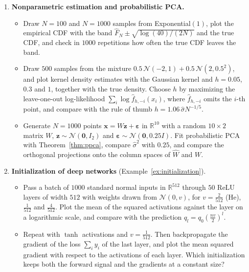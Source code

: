 \documentclass[11pt]{article}
\theoremstyle{definition}
\theoremstyle{plain}
\theoremstyle{remark}
\begin{document}
\begin{enumerate}[label=\textbf{P\arabic*.}, leftmargin=*]
    \item \textbf{Nonparametric estimation and probabilistic PCA.}
    \begin{itemize}
        \item Draw $N = 100$ and $N = 1000$ samples from Exponential$(1)$, plot the empirical CDF with the band $\hat F_N \pm \sqrt{\log(40)/(2N)}$ and the true CDF, and check in $1000$ repetitions how often the true CDF leaves the band.
        \item Draw $500$ samples from the mixture $0.5\,\mathcal{N}(-2, 1) + 0.5\,\mathcal{N}(2, 0.5^2)$, and plot kernel density estimates with the Gaussian kernel and $h = 0.05$, $0.3$ and $1$, together with the true density. Choose $h$ by maximizing the leave-one-out log-likelihood $\sum_i \log\hat f_{h, -i}(x_i)$, where $\hat f_{h, -i}$ omits the $i$-th point, and compare with the rule of thumb $h = 1.06\,\hat\sigma N^{-1/5}$.
        \item Generate $N = 1000$ points $\mathbf{x} = W\mathbf{z} + \boldsymbol{\varepsilon}$ in $\mathbb{R}^{10}$ with a random $10 \times 2$ matrix $W$, $\mathbf{z} \sim \mathcal{N}(\mathbf{0}, I_2)$ and $\boldsymbol{\varepsilon} \sim \mathcal{N}(\mathbf{0}, 0.25I)$. Fit probabilistic PCA with Theorem~\ref{thm:ppca}, compare $\hat\sigma^2$ with $0.25$, and compare the orthogonal projections onto the column spaces of $\hat W$ and $W$.
    \end{itemize}

    \item \textbf{Initialization of deep networks} (Example~\ref{ex:initialization}).
    \begin{itemize}
        \item Pass a batch of $1000$ standard normal inputs in $\mathbb{R}^{512}$ through $50$ ReLU layers of width $512$ with weights drawn from $\mathcal{N}(0, v)$, for $v = \frac{2}{512}$ (He), $\frac{1}{512}$ and $\frac{4}{512}$. Plot the mean of the squared activations against the layer on a logarithmic scale, and compare with the prediction $q_l = q_0(\frac{nv}{2})^l$.
        \item Repeat with $\tanh$ activations and $v = \frac{1}{512}$. Then backpropagate the gradient of the loss $\sum_i y_i$ of the last layer, and plot the mean squared gradient with respect to the activations of each layer. Which initialization keeps both the forward signal and the gradients at a constant size?
    \end{itemize}


\end{enumerate}
\end{document}
